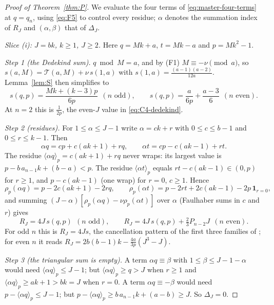 \documentclass[11pt]{article}
\theoremstyle{definition}
\newcommand{\ind}{\mathbf 1}
\begin{document}
\begin{proof}[Proof of Theorem~\ref{thm:P}]
We evaluate the four terms of \eqref{eq:master-four-terms} at $q=q_n$,
using \eqref{eq:F5} to control every residue; $\alpha$ denotes the
summation index of $R_J$ and $(\alpha,\beta)$ that of $\Delta_J$.

\medskip\noindent\emph{Slice (i): $J=bk$, $k\geq1$, $J\geq2$.}  Here
$q=Mk+a$, $t=Mk-a$ and $p=Mk^2-1$.

\emph{Step 1 (the Dedekind sum).}  $q\bmod M=a$, and by (F1)
$M\equiv-\nu\pmod a$, so $s(a,M)=\mathcal T(a,M)+\nu\,s(1,a)$ with
$s(1,a)=\frac{(a-1)(a-2)}{12a}$.  Lemma~\ref{lem:S} then simplifies to
\begin{equation}
 s(q,p)=\frac{Mk+(k-3)p}{6p}\ \ (n\text{ odd}),\qquad
 s(q,p)=\frac a{6p}+\frac{a-3}6\ \ (n\text{ even}).
 \label{eq:P-i-dedekind}
\end{equation}
At $n=2$ this is $\frac1{2p}$, the even-$J$ value in
\eqref{eq:C4-dedekind}.

\emph{Step 2 (residues).}  For $1\leq\alpha\leq J-1$ write $\alpha=ck+r$
with $0\leq c\leq b-1$ and $0\leq r\leq k-1$.  Then
\[
 \alpha q=cp+c(ak+1)+rq,\qquad \alpha t=cp-c(ak-1)+rt .
\]
The residue $\langle\alpha q\rangle_p=c(ak+1)+rq$ never wraps: its
largest value is $p-b\,a_{n-1}k+(b-a)<p$.  The residue
$\langle\alpha t\rangle_p$ equals $rt-c(ak-1)\in(0,p)$ for $r\geq1$, and
$p-c(ak-1)$ (one wrap) for $r=0$, $c\geq1$.  Hence
\[
 \rho_p(\alpha q)=p-2c(ak+1)-2rq,\qquad
 \rho_p(\alpha t)=p-2rt+2c(ak-1)-2p\,\ind_{r=0},
\]
and summing $(J-\alpha)[\rho_p(\alpha q)-\nu\rho_p(\alpha t)]$ over
$\alpha$ (Faulhaber sums in $c$ and $r$) gives
\begin{equation}
 R_J=4J\,s(q,p)\ \ (n\text{ odd}),\qquad
 R_J=4J\,s(q,p)+\tfrac23P_{n-2}J\ \ (n\text{ even}).
 \label{eq:P-i-residue}
\end{equation}
For odd $n$ this is $R_J=4Js$, the cancellation pattern of the first
three families of \cite[Thm.~7.1]{MahmoodP1Collection2026}; for even $n$
it reads $R_J=2b(b-1)k-\frac{4a}{3p}(J^3-J)$.

\emph{Step 3 (the triangular sum is empty).}  A term $\alpha q\equiv\beta$
with $1\leq\beta\leq J-1-\alpha$ would need
$\langle\alpha q\rangle_p\leq J-1$; but $\langle\alpha q\rangle_p\geq q>J$
when $r\geq1$ and $\langle\alpha q\rangle_p\geq ak+1>bk=J$ when $r=0$.  A
term $\alpha q\equiv-\beta$ would need $p-\langle\alpha q\rangle_p\leq J-1$;
but $p-\langle\alpha q\rangle_p\geq b\,a_{n-1}k+(a-b)\geq J$.  So
$\Delta_J=0$.


\end{proof}
\end{document}

